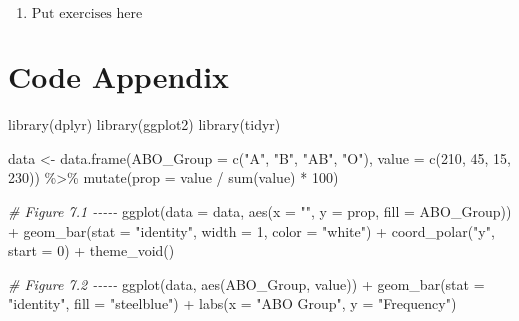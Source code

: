 \documentclass[
]{book}
\newenvironment{Shaded}{\begin{snugshade}}{\end{snugshade}}
\newcommand{\AttributeTok}[1]{\textcolor[rgb]{0.77,0.63,0.00}{#1}}
\newcommand{\CommentTok}[1]{\textcolor[rgb]{0.56,0.35,0.01}{\textit{#1}}}
\newcommand{\DecValTok}[1]{\textcolor[rgb]{0.00,0.00,0.81}{#1}}
\newcommand{\FunctionTok}[1]{\textcolor[rgb]{0.00,0.00,0.00}{#1}}
\newcommand{\NormalTok}[1]{#1}
\newcommand{\OtherTok}[1]{\textcolor[rgb]{0.56,0.35,0.01}{#1}}
\newcommand{\SpecialCharTok}[1]{\textcolor[rgb]{0.00,0.00,0.00}{#1}}
\newcommand{\StringTok}[1]{\textcolor[rgb]{0.31,0.60,0.02}{#1}}
\providecommand{\tightlist}{%
  \setlength{\itemsep}{0pt}\setlength{\parskip}{0pt}}
\begin{document}
\begin{enumerate}
\def\labelenumi{\arabic{enumi}.}
\tightlist
\item
  \(\text{Put exercises here}\)
\end{enumerate}

\hypertarget{code-appendix}{%
\section{Code Appendix}\label{code-appendix}}

\begin{Shaded}
\begin{Highlighting}[]
\FunctionTok{library}\NormalTok{(dplyr)}
\FunctionTok{library}\NormalTok{(ggplot2)}
\FunctionTok{library}\NormalTok{(tidyr)}

\NormalTok{data }\OtherTok{\textless{}{-}} \FunctionTok{data.frame}\NormalTok{(}\AttributeTok{ABO\_Group =} \FunctionTok{c}\NormalTok{(}\StringTok{"A"}\NormalTok{, }\StringTok{"B"}\NormalTok{, }\StringTok{"AB"}\NormalTok{, }\StringTok{"O"}\NormalTok{), }\AttributeTok{value =} \FunctionTok{c}\NormalTok{(}\DecValTok{210}\NormalTok{, }\DecValTok{45}\NormalTok{, }\DecValTok{15}\NormalTok{, }\DecValTok{230}\NormalTok{)) }\SpecialCharTok{\%\textgreater{}\%}
  \FunctionTok{mutate}\NormalTok{(}\AttributeTok{prop =}\NormalTok{ value }\SpecialCharTok{/} \FunctionTok{sum}\NormalTok{(value) }\SpecialCharTok{*} \DecValTok{100}\NormalTok{)}

\CommentTok{\# Figure 7.1 {-}{-}{-}{-}{-}}
\FunctionTok{ggplot}\NormalTok{(}\AttributeTok{data =}\NormalTok{ data, }\FunctionTok{aes}\NormalTok{(}\AttributeTok{x =} \StringTok{""}\NormalTok{, }\AttributeTok{y =}\NormalTok{ prop, }\AttributeTok{fill =}\NormalTok{ ABO\_Group)) }\SpecialCharTok{+} 
  \FunctionTok{geom\_bar}\NormalTok{(}\AttributeTok{stat =} \StringTok{"identity"}\NormalTok{, }\AttributeTok{width =} \DecValTok{1}\NormalTok{, }\AttributeTok{color =} \StringTok{"white"}\NormalTok{) }\SpecialCharTok{+} 
  \FunctionTok{coord\_polar}\NormalTok{(}\StringTok{"y"}\NormalTok{, }\AttributeTok{start =} \DecValTok{0}\NormalTok{) }\SpecialCharTok{+} 
  \FunctionTok{theme\_void}\NormalTok{()}

\CommentTok{\# Figure 7.2 {-}{-}{-}{-}{-}}
\FunctionTok{ggplot}\NormalTok{(data, }\FunctionTok{aes}\NormalTok{(ABO\_Group, value)) }\SpecialCharTok{+} 
  \FunctionTok{geom\_bar}\NormalTok{(}\AttributeTok{stat =} \StringTok{"identity"}\NormalTok{, }\AttributeTok{fill =} \StringTok{"steelblue"}\NormalTok{) }\SpecialCharTok{+} 
  \FunctionTok{labs}\NormalTok{(}\AttributeTok{x =} \StringTok{"ABO Group"}\NormalTok{, }\AttributeTok{y =} \StringTok{"Frequency"}\NormalTok{)}


\end{Highlighting}
\end{Shaded}
\end{document}
